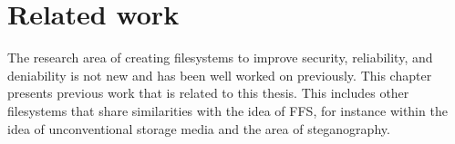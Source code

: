 \chapter{Related work}
\label{ch:related_work}
The research area of creating filesystems to improve security, reliability, and deniability is not new and has been well worked on previously. This chapter presents previous work that is related to this thesis. This includes other filesystems that share similarities with the idea of \gls{FFS}, for instance within the idea of unconventional storage media and the area of steganography.









